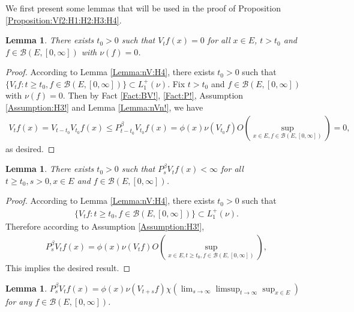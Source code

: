 \documentclass[12pt,a4paper]{amsart}
\numberwithin{equation}{section}
\theoremstyle{plain}
\newtheorem{lem}[thm]{Lemma}
\theoremstyle{definition}
\theoremstyle{remark}
\begin{document}
\subsubsection{}
We first present some lemmas that will be used in the proof of Proposition \ref{Proposition:Vf2:H1:H2:H3:H4}.
\begin{lem} \label{Lemma:nullVf:H3:H4}
There exists $t_0>0$ such that $V_t f(x ) = 0$ for all $x\in E$, $t > t_0$ and $f \in \mathcal B(E,[0,\infty])$ with $\nu(f) = 0$.
\end{lem}
\begin{proof}
According to Lemma \ref{Lemma:nV:H4}, there exists $t_0> 0$ such that $\{V_t f: t \geq t_0, f \in \mathcal B(E,[0,\infty])\} \subset L_1^+(\nu). $
Fix $t>t_0$ and $f \in \mathcal B(E,[0,\infty])$ with $\nu(f) = 0$.
Then by Fact \ref{Fact:BV!}, \ref{Fact:P!}, Assumption \ref{Assumption:H3!} and Lemma \ref{Lemma:nVn!}, we have
\begin{align}V_tf(x) = V_{t-t_0} V_{t_0}f(x)
 \leq P_{t - t_0}^\beta V_{t_0} f(x)
 = \phi(x)\nu(V_{t_0} f) O(\sup_{x\in E, f\in \mathcal B(E,[0,\infty])})
 = 0,
\end{align}
as desired.
\end{proof}
\begin{lem} \label{Lemma:PV:H3:H4}
There exists $t_0>0$ such that $P_s^\beta V_t f(x) < \infty$ for all $t \geq t_0, s> 0, x\in E$ and $f\in \mathcal B(E,[0,\infty])$.
\end{lem}
\begin{proof}
According to Lemma \ref{Lemma:nV:H4}, there exists $t_0> 0$ such that
\begin{align}
 \{V_t f: t \geq t_0, f \in \mathcal B(E,[0,\infty])\}
 \subset L_1^+(\nu).
 \end{align}
Therefore according to Assumption \ref{Assumption:H3!},
\begin{align}
 P_s^\beta V_tf(x)
 = \phi(x)\nu(V_tf) O(\sup_{x\in E, t\geq t_0, f\in \mathcal B(E,[0,\infty])}),
 \end{align}
This implies the desired result.
\end{proof}
\begin{lem} \label{Lemma:PVf:H1:H2:H3:H4}
$P_s^\beta V_t f(x) = \phi(x) \nu(V_{t+s}f) \chi (\lim_{s\to \infty} \limsup_{t\to \infty} \sup_{x\in E})$ for any $f\in \mathcal B(E,[0,\infty])$.
\end{lem}
\end{document}
